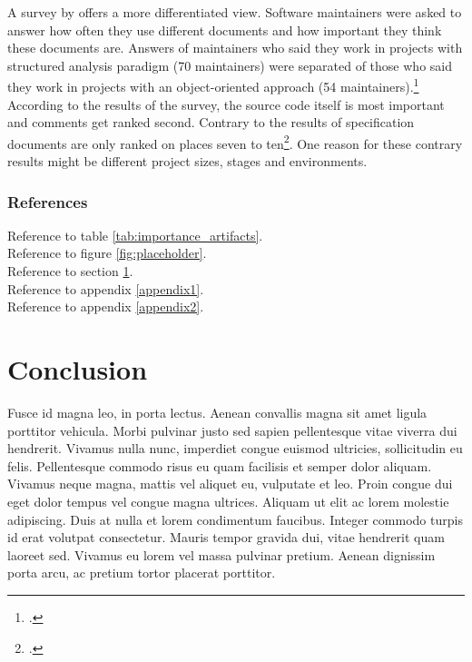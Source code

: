 A survey by \citeauthor{de_souza_study_2005} offers a more differentiated view.
Software maintainers were asked to answer how often they use different documents
and how important they think these documents are. Answers of maintainers who
said they work in projects with structured analysis paradigm (70 maintainers)
were separated of those who said they work in projects with an object-oriented
approach (54 maintainers).\footcite[Cf.][69-74]{de_souza_study_2005}
According to the results of the survey, the source code itself is most important
and comments get ranked second. Contrary to the results of \citeauthor{forward_relevance_2002}
specification documents are only ranked on places seven to
ten\footcite[Cf.][98]{huang_towards_2003}. One reason for these contrary results
might be different project sizes, stages and environments.

\subsubsection{References}

Reference to table \ref{tab:importance_artifacts}.\\
Reference to figure \ref{fig:placeholder}.\\
Reference to section \ref{sec:conclusion}.\\
Reference to appendix \ref{appendix1}.\\
Reference to appendix \ref{appendix2}.\\


\newpage


\section{Conclusion}
\label{sec:conclusion}

Fusce id magna leo, in porta lectus. Aenean convallis magna sit amet ligula
porttitor vehicula. Morbi pulvinar justo sed sapien pellentesque vitae viverra
dui hendrerit. Vivamus nulla nunc, imperdiet congue euismod ultricies,
sollicitudin eu felis. Pellentesque commodo risus eu quam facilisis et semper
dolor aliquam. Vivamus neque magna, mattis vel aliquet eu, vulputate et leo.
Proin congue dui eget dolor tempus vel congue magna ultrices. Aliquam ut elit
ac lorem molestie adipiscing. Duis at nulla et lorem condimentum faucibus.
Integer commodo turpis id erat volutpat consectetur. Mauris tempor gravida
dui, vitae hendrerit quam laoreet sed. Vivamus eu lorem vel massa pulvinar
pretium. Aenean dignissim porta arcu, ac pretium tortor placerat porttitor. 







